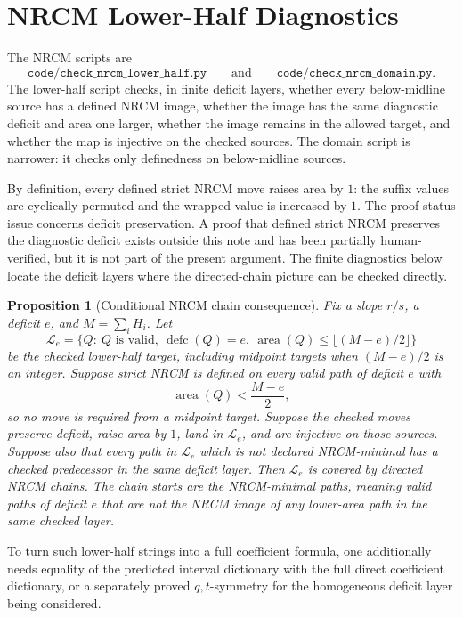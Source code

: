 \documentclass{article}
\newcommand{\defc}{\operatorname{defc}}
\newcommand{\area}{\operatorname{area}}
\newtheorem{proposition}{Proposition}
\begin{document}
\section{NRCM Lower-Half Diagnostics}

The NRCM scripts are
\[
  \texttt{code/check\_nrcm\_lower\_half.py}
  \qquad\text{and}\qquad
  \texttt{code/check\_nrcm\_domain.py}.
\]
The lower-half script checks, in finite deficit layers, whether every
below-midline source has a defined NRCM image, whether the image has the same
diagnostic deficit and area one larger, whether the image remains in the
allowed target, and whether the map is injective on the checked sources.  The
domain script is narrower: it checks only definedness on below-midline
sources.

By definition, every defined strict NRCM move raises area by \(1\): the suffix
values are cyclically permuted and the wrapped value is increased by \(1\).
The proof-status issue concerns deficit preservation.  A proof that defined
strict NRCM preserves the diagnostic deficit exists outside this note and has
been partially human-verified, but it is not part of the present argument.  The
finite diagnostics below locate the deficit layers where the directed-chain
picture can be checked directly.

\begin{proposition}[Conditional NRCM chain consequence]
Fix a slope \(r/s\), a deficit \(e\), and \(M=\sum_iH_i\).  Let
\[
  \mathcal L_e=\{Q:\ Q\text{ is valid},\ \defc(Q)=e,\ 
    \area(Q)\le \lfloor(M-e)/2\rfloor\}
\]
be the checked lower-half target, including midpoint targets when
\((M-e)/2\) is an integer.  Suppose strict NRCM is defined on every valid path
of deficit \(e\) with
\[
  \area(Q)<\frac{M-e}{2},
\]
so no move is required from a midpoint target.  Suppose the checked moves
preserve deficit, raise area by \(1\), land in \(\mathcal L_e\), and are
injective on those sources.  Suppose also that every path in \(\mathcal L_e\)
which is not declared NRCM-minimal has a checked predecessor in the same
deficit layer.  Then \(\mathcal L_e\) is covered by directed NRCM chains.  The
chain starts are the NRCM-minimal paths, meaning valid paths of deficit \(e\)
that are not the NRCM image of any lower-area path in the same checked layer.
\end{proposition}

To turn such lower-half strings into a full coefficient formula, one
additionally needs equality of the predicted interval dictionary with the full
direct coefficient dictionary, or a separately proved \(q,t\)-symmetry for the
homogeneous deficit layer being considered.
\end{document}
